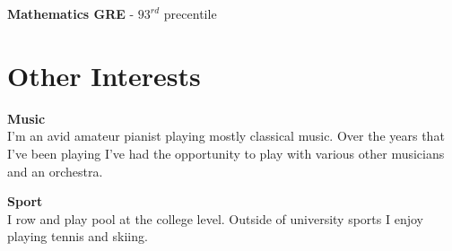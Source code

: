 \documentclass[12pt,a4paper,sans]{moderncv}
\begin{document}
\vspace{3mm}

\textbf{Mathematics GRE} - $93^{rd}$ precentile 

\section{Other Interests}

\textbf{Music} \\
{I'm an avid amateur pianist playing mostly classical music. Over the years that I've been playing I've had the opportunity to play with various other musicians and an orchestra.}

\vspace{3mm}

\textbf{Sport} \\
{I row and play pool at the college level. Outside of university sports I enjoy playing tennis and skiing. }
\end{document}
